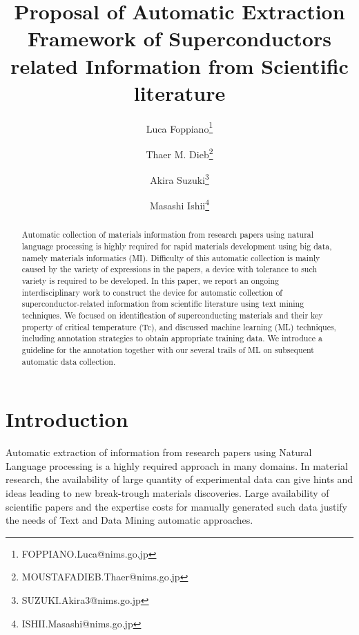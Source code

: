 \documentclass{article}
\title{Proposal of Automatic Extraction Framework of Superconductors related Information from Scientific literature}
\author[1]{Luca Foppiano\thanks{FOPPIANO.Luca@nims.go.jp}}
\author[1]{Thaer M. Dieb\thanks{MOUSTAFADIEB.Thaer@nims.go.jp}}
\author[1]{Akira Suzuki\thanks{SUZUKI.Akira3@nims.go.jp}}
\author[1]{Masashi Ishii\thanks{ISHII.Masashi@nims.go.jp}}
\affil[1]{Research and Services Division of Materials Data and Integrated System (MaDIS), National Institute for Materials Science (NIMS), 1-2-1 Sengen, Tsukuba, Ibaraki 305-0047, Japan}
\begin{document}
\maketitle

\begin{abstract}
Automatic collection of materials information from research papers using natural language processing is highly required for rapid materials development using big data, namely materials informatics (MI). Difficulty of this automatic collection is mainly caused by the variety of expressions in the papers, a device with tolerance to such variety is required to be developed. 
In this paper, we report an ongoing interdisciplinary work to construct the device for automatic collection of superconductor-related information from scientific literature using text mining techniques. We focused on identification of superconducting materials and their key property of critical temperature (Tc), and discussed machine learning (ML) techniques, including annotation strategies to obtain appropriate training data. We introduce a guideline for the annotation together with our several trails of ML on subsequent automatic data collection.
\end{abstract}

\pagebreak





\section{Introduction}

Automatic extraction of information from research papers using Natural Language processing is a highly required approach in many domains. In material research, the availability of large quantity of experimental data can give hints and ideas leading to new break-trough materials discoveries. Large availability of scientific papers and the expertise costs for manually generated such data justify the needs of Text and Data Mining automatic approaches.
\end{document}
